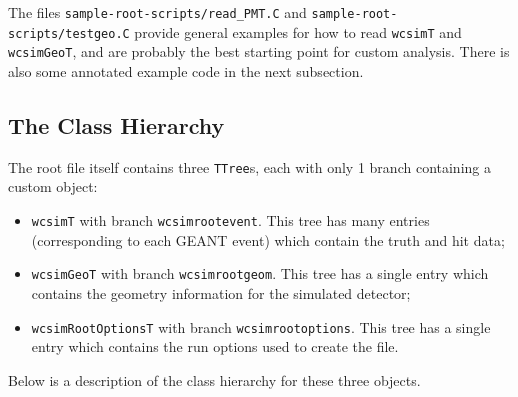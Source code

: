 The files \texttt{sample-root-scripts/read\_PMT.C} and \texttt{sample-root-scripts/testgeo.C} provide general examples for how to read \texttt{wcsimT} and \texttt{wcsimGeoT}, and are probably the best starting point for custom analysis.  There is also some annotated example code in the next subsection.


\subsection{The Class Hierarchy}

The root file itself contains three \texttt{TTree}s, each with only 1 branch containing a custom object:
\begin{itemize}
\item \texttt{wcsimT} with branch \texttt{wcsimrootevent}. This tree has many entries (corresponding to each GEANT event) which contain the truth and hit data;
\item \texttt{wcsimGeoT} with branch \texttt{wcsimrootgeom}. This tree has a single entry which contains the geometry information for the simulated detector;
\item \texttt{wcsimRootOptionsT} with branch \texttt{wcsimrootoptions}. This tree has a single entry which contains the run options used to create the file.
\end{itemize}
Below is a description of the class hierarchy for these three objects.

